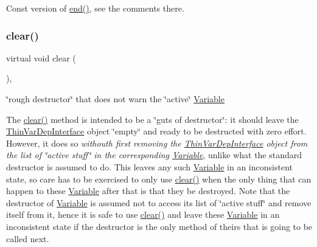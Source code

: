Const version of \mbox{\hyperlink{group___thin_var_dep_interface___c_l_a_s_s_e_s_gae1175d5cbc6627e3e49ed9bcb58ffce9}{end()}}, see the comments there. \mbox{\label{group___thin_var_dep_interface___c_l_a_s_s_e_s_gae16067de85b435fac4ce8558b193a99a}} 
\subsubsection{\texorpdfstring{clear()}{clear()}}
{\footnotesize\ttfamily virtual void clear (\begin{DoxyParamCaption}\item[{void}]{ }\end{DoxyParamCaption})\hspace{0.3cm}{\ttfamily [inline]}, {\ttfamily [virtual]}}



\char`\"{}rough destructor\char`\"{} that does not warn the \char`\"{}active\char`\"{} \mbox{\hyperlink{class_s_m_spp__di__unipi__it_1_1_variable}{Variable}} 

The \mbox{\hyperlink{group___thin_var_dep_interface___c_l_a_s_s_e_s_gae16067de85b435fac4ce8558b193a99a}{clear()}} method is intended to be a \char`\"{}guts of destructor\char`\"{}\+: it should leave the \mbox{\hyperlink{class_s_m_spp__di__unipi__it_1_1_thin_var_dep_interface}{Thin\+Var\+Dep\+Interface}} object \char`\"{}empty\char`\"{} and ready to be destructed with zero effort. However, it does so {\itshape withouth first removing the \mbox{\hyperlink{class_s_m_spp__di__unipi__it_1_1_thin_var_dep_interface}{Thin\+Var\+Dep\+Interface}} object from the list of \char`\"{}active stuff\char`\"{} in the corresponding \mbox{\hyperlink{class_s_m_spp__di__unipi__it_1_1_variable}{Variable}}}, unlike what the standard destructor is assumed to do. This leaves any such \mbox{\hyperlink{class_s_m_spp__di__unipi__it_1_1_variable}{Variable}} in an inconsistent state, so care has to be exercised to only use \mbox{\hyperlink{group___thin_var_dep_interface___c_l_a_s_s_e_s_gae16067de85b435fac4ce8558b193a99a}{clear()}} when the only thing that can happen to these \mbox{\hyperlink{class_s_m_spp__di__unipi__it_1_1_variable}{Variable}} after that is that they be destroyed. Note that the destructor of \mbox{\hyperlink{class_s_m_spp__di__unipi__it_1_1_variable}{Variable}} is assumed not to access its list of \char`\"{}active
stuff\char`\"{} and remove itself from it, hence it is safe to use \mbox{\hyperlink{group___thin_var_dep_interface___c_l_a_s_s_e_s_gae16067de85b435fac4ce8558b193a99a}{clear()}} and leave these \mbox{\hyperlink{class_s_m_spp__di__unipi__it_1_1_variable}{Variable}} in an inconsistent state if the destructor is the only method of theirs that is going to be called next.

